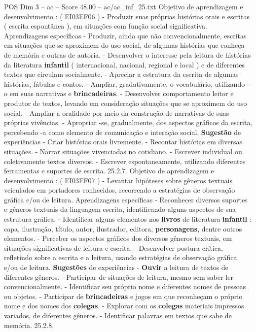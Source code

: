 \begin{textsample}{POS Dim 3 – ac – Score 48.00 – ac/ac\_inf\_25.txt}
Objetivo de aprendizagem e desenvolvimento : ( EI03EF06 ) - Produzir suas próprias histórias orais e escritas ( escrita espontânea ), em situações com função social significativa.
Aprendizagens específicas - Produzir, ainda que não convencionalmente, escritas em situações que se aproximem do uso social, de algumas histórias que conheça de memória e outras de autoria. - Desenvolver o interesse pela leitura de histórias da literatura \textbf{infantil} ( internacional, nacional, regional e local ) e de diferentes textos que circulam socialmente. - Apreciar a estrutura da escrita de algumas histórias, fábulas e contos. - Ampliar, gradativamente, o vocabulário, utilizando -o em suas narrativas e \textbf{brincadeiras}. - Desenvolver comportamento leitor e produtor de textos, levando em consideração situações que se aproximem do uso social. - Ampliar a oralidade por meio da construção de narrativas de suas próprias vivências. - Apropriar -se, gradualmente, dos aspectos gráficos da escrita, percebendo -a como elemento de comunicação e interação social. \textbf{Sugestão} de experiências - Criar histórias orais livremente. - Recontar histórias em diversas situações. - Narrar situações vivenciadas no cotidiano. - Escrever individual ou coletivamente textos diversos. - Escrever espontaneamente, utilizando diferentes ferramentas e suportes de escrita. 25.2.7.
Objetivo de aprendizagem e desenvolvimento : ( EI03EF07 ) - Levantar hipóteses sobre gêneros textuais veiculados em portadores conhecidos, recorrendo a estratégias de observação gráfica e/ou de leitura.
Aprendizagens específicas - Reconhecer diversos suportes e gêneros textuais da linguagem escrita, identificando alguns aspectos de sua estrutura gráfica. - Identificar alguns elementos nos \textbf{livros} de literatura \textbf{infantil} : capa, ilustração, título, autor, ilustrador, editora, \textbf{personagens}, dentre outros elementos. - Perceber os aspectos gráficos dos diversos gêneros textuais, em situações significativas de leitura e escrita. - Desenvolver postura crítica, refletindo sobre a escrita e a leitura, usando estratégias de observação gráfica e/ou de leitura. \textbf{Sugestões} de experiências - \textbf{Ouvir} a leitura de textos de diferentes gêneros. - Participar de situações de leitura, mesmo sem saber ler convencionalmente. - Identificar seu próprio nome e diferentes nomes de pessoas ou objetos. - Participar de \textbf{brincadeiras} e jogos em que reconheçam o próprio nome e dos nomes dos \textbf{colegas}. - Explorar com os \textbf{colegas} materiais impressos variados, de diferentes gêneros. - Identificar palavras em textos que sabe de memória. 25.2.8.

\end{textsample}
